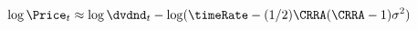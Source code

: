 \begin{equation}\begin{gathered}\begin{aligned}
  \log \Price_{t} & \approx  \log \dvdnd_{t}  - \log (\timeRate -  (1/2)\CRRA (\CRRA-1) \sigma^{2})\label{eq:PtLogRW}
\end{aligned}\end{gathered}\end{equation}
